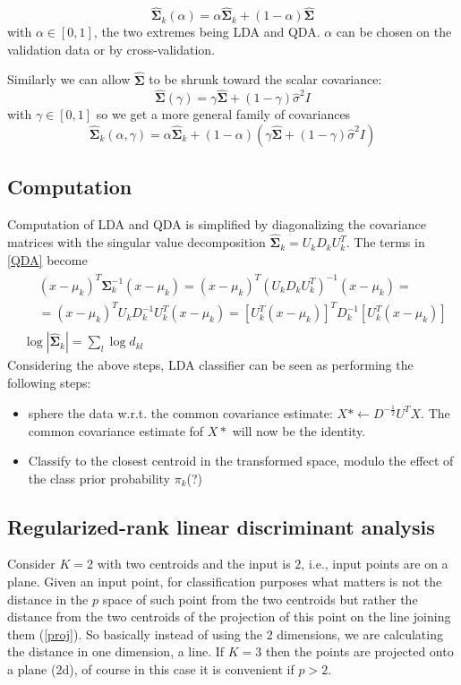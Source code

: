 \documentclass[12pt, letterpaper]{article}
\theoremstyle{definition}
\newcommand{\hS}{\mathrm{\hat{\mathbf{\Sigma}}}}
\newcommand{\si}{\mathbf{\Sigma}^{-1}}
\begin{document}
\begin{equation}
\hS_k(\alpha) = \alpha\hS_k+(1-\alpha) \hS
\end{equation}
with $\alpha \in [0,1]$, the two extremes being LDA and QDA. $\alpha$ can be chosen on the validation data or by cross-validation.

Similarly we can allow $\hS$ to be shrunk toward the scalar covariance:
\begin{equation}
\hS(\gamma) = \gamma\hS+(1-\gamma) \hat{\sigma}^2 I
\end{equation}
with $\gamma \in [0,1]$
so we get a more general family of covariances
\begin{equation}
\hS_k(\alpha, \gamma) = \alpha\hS_k+\left(1-\alpha\right) \left(\gamma\hS+\left(1-\gamma\right) \hat{\sigma}^2 I\right)
\end{equation}

\subsection{Computation}
Computation of LDA and QDA is simplified by diagonalizing the covariance matrices with the singular value decomposition $\hS_k = U_kD_kU_k^T$. The terms in \ref{QDA} become
\begin{align}
&\begin{aligned}
&\left( x - \mu_k \right)^T \si_k\left( x - \mu_k \right)= \left( x - \mu_k \right)^T \left(U_kD_kU_k^T\right)^{-1}\left( x - \mu_k \right) =\\
&= \left( x - \mu_k \right)^T U_kD_k^{-1}U_k^T\left( x - \mu_k \right) =  \left[ U_k^T\left( x - \mu_k \right)\right]^T D_k^{-1}\left[ U_k^T\left( x - \mu_k \right)\right]
\end{aligned}\\
& \log |\hS_k| = \sum_l \log d_{kl}
\end{align}
Considering the above steps, LDA classifier can be seen as performing the following steps:
\begin{itemize}
\item sphere the data w.r.t. the common covariance estimate: $X*\leftarrow D^{-\frac{1}{2}} U^T X$. The common covariance estimate fof $X*$ will now be the identity.
\item Classify to the closest centroid in the transformed space, modulo the effect of the class prior probability $\pi_k$(?)
\end{itemize}
\subsection{Regularized-rank linear discriminant analysis}
Consider $K=2$ with two centroids and the input is $2$, i.e., input points are on a plane. Given an input point, for classification purposes what matters is not the distance in the $p$ space of such point from the two centroids but rather the distance from the two centroids of the projection of this point on the line joining them (\ref{proj}). So basically instead of using the $2$ dimensions, we are calculating the distance in one dimension, a line. If $K=3$ then the points are projected onto a plane (2d), of course in this case it is convenient if $p>2$.
\end{document}
